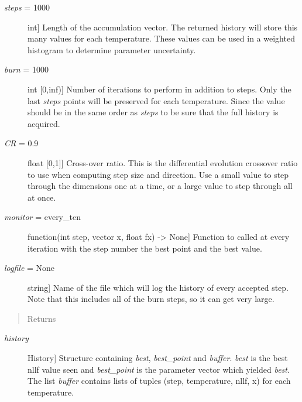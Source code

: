 \documentclass[letterpaper,10pt,english]{sphinxmanual}
\begin{document}
\begin{fulllineitems}
\begin{description}
\item[{\emph{steps} = 1000}] \leavevmode{[}int{]}
Length of the accumulation vector.  The returned history will store
this many values for each temperature.  These values can be used in
a weighted histogram to determine parameter uncertainty.

\item[{\emph{burn} = 1000}] \leavevmode{[}int \textbar{} {[}0,inf){]}
Number of iterations to perform in addition to steps.  Only the
last \emph{steps} points will be preserved for each temperature.  Since
the
value should be in the same order as \emph{steps} to be sure that the
full history is acquired.

\item[{\emph{CR} = 0.9}] \leavevmode{[}float \textbar{} {[}0,1{]}{]}
Cross-over ratio.  This is the differential evolution crossover
ratio to use when computing step size and direction.  Use a small
value to step through the dimensions one at a time, or a large value
to step through all at once.

\item[{\emph{monitor} = every\_ten}] \leavevmode{[}function(int step, vector x, float fx) -\textgreater{} None{]}
Function to called at every iteration with the step number the
best point and the best value.

\item[{\emph{logfile} = None}] \leavevmode{[}string{]}
Name of the file which will log the history of every accepted step.
Note that this includes all of the burn steps, so it can get very
large.

\end{description}
\begin{quote}\begin{description}
\item[{Returns }] \leavevmode
\end{description}\end{quote}
\begin{description}
\item[{\emph{history}}] \leavevmode{[}History{]}
Structure containing \emph{best}, \emph{best\_point} and \emph{buffer}.  \emph{best} is
the best nllf value seen and \emph{best\_point} is the parameter vector
which yielded \emph{best}.  The list \emph{buffer} contains lists of tuples
(step, temperature, nllf, x) for each temperature.

\end{description}

\end{fulllineitems}
\end{document}
